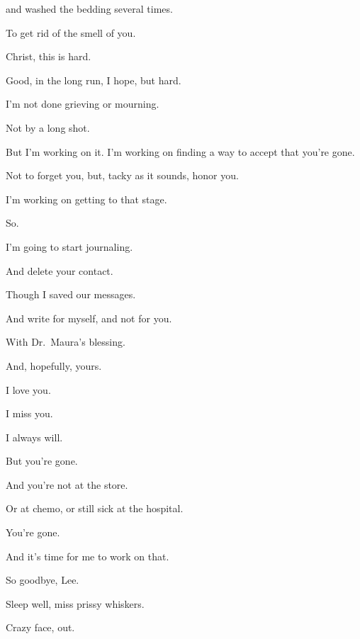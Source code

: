 {
and washed the bedding several times.

To get rid of the smell of you.

Christ, this is hard.

Good, in the long run, I hope, but
hard.

I'm not done grieving or mourning.

Not by a long shot.

But I'm working on it. I'm working
on finding a way to accept that you're gone.

Not to forget you, but, tacky as it
sounds, honor you.

I'm working on getting to that
stage.

So.

I'm going to start journaling.

And delete your contact.

Though I saved our messages.

And write for myself, and not for
you.

With Dr.~Maura's blessing.

And, hopefully, yours.

I love you.

I miss you.

I always will.

But you're gone.

And you're not at the store.

Or at chemo, or still sick at the
hospital.

You're gone.

And it's time for me to work on
that.

So goodbye, Lee.

Sleep well, miss prissy whiskers.

Crazy face, out.

} %
